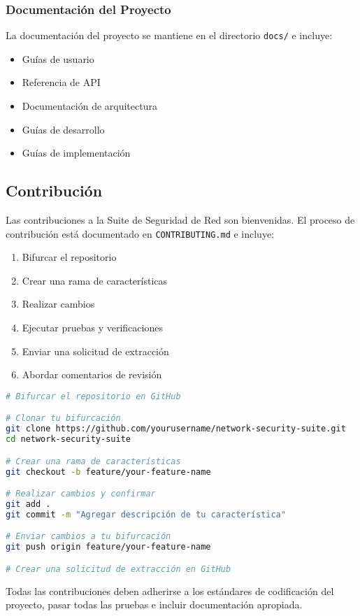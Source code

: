 \subsubsection{Documentación del Proyecto}
La documentación del proyecto se mantiene en el directorio \texttt{docs/} e incluye:

\begin{itemize}
    \item Guías de usuario
    \item Referencia de API
    \item Documentación de arquitectura
    \item Guías de desarrollo
    \item Guías de implementación
\end{itemize}

\subsection{Contribución}
Las contribuciones a la Suite de Seguridad de Red son bienvenidas. El proceso de contribución está documentado en \texttt{CONTRIBUTING.md} e incluye:

\begin{enumerate}
    \item Bifurcar el repositorio
    \item Crear una rama de características
    \item Realizar cambios
    \item Ejecutar pruebas y verificaciones
    \item Enviar una solicitud de extracción
    \item Abordar comentarios de revisión
\end{enumerate}

\begin{lstlisting}[language=bash, caption=Flujo de Trabajo de Contribución]
# Bifurcar el repositorio en GitHub

# Clonar tu bifurcación
git clone https://github.com/yourusername/network-security-suite.git
cd network-security-suite

# Crear una rama de características
git checkout -b feature/your-feature-name

# Realizar cambios y confirmar
git add .
git commit -m "Agregar descripción de tu característica"

# Enviar cambios a tu bifurcación
git push origin feature/your-feature-name

# Crear una solicitud de extracción en GitHub
\end{lstlisting}

Todas las contribuciones deben adherirse a los estándares de codificación del proyecto, pasar todas las pruebas e incluir documentación apropiada.